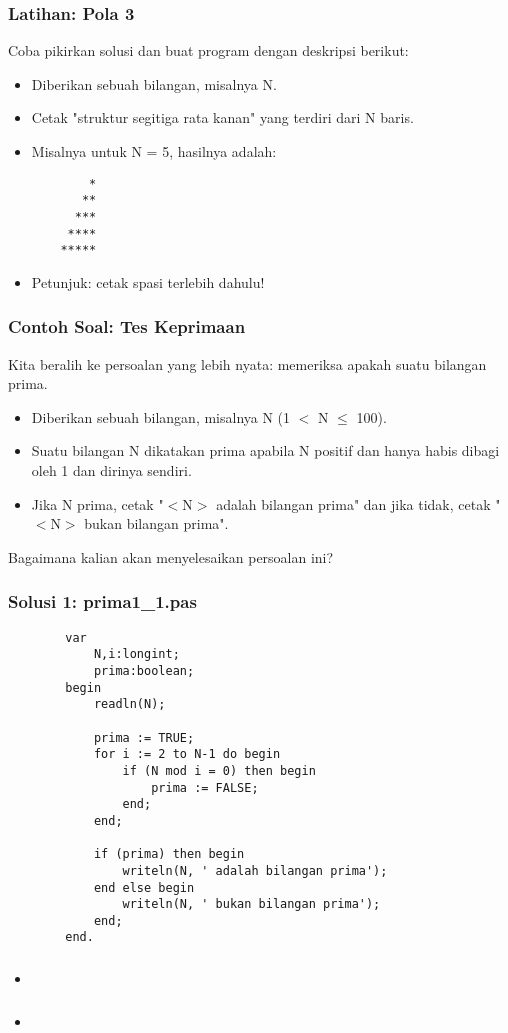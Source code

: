 \documentclass{beamer}
\begin{document}
\begin{frame}[fragile]
\frametitle{Latihan: Pola 3}
Coba pikirkan solusi dan buat program dengan deskripsi berikut:
\begin{itemize}
	\item Diberikan sebuah bilangan, misalnya N.
	\item Cetak "struktur segitiga rata kanan" yang terdiri dari N baris.
	\item Misalnya untuk N = 5, hasilnya adalah:
	\begin{lstlisting}
	    *
	   **
	  ***
	 ****
	*****
	\end{lstlisting} 
	\item Petunjuk: cetak spasi terlebih dahulu!
\end{itemize}
\end{frame}

\begin{frame}
\frametitle{Contoh Soal: Tes Keprimaan}
Kita beralih ke persoalan yang lebih nyata: memeriksa apakah suatu bilangan prima.
\begin{itemize}
	\item Diberikan sebuah bilangan, misalnya N (1 $<$ N $\leq$ 100).
	\item Suatu bilangan N dikatakan prima apabila N positif dan hanya habis dibagi oleh 1 dan dirinya sendiri.
	\item Jika N prima, cetak "$<$N$>$ adalah bilangan prima" dan jika tidak, cetak "$<$N$>$ bukan bilangan prima".
\end{itemize}
Bagaimana kalian akan menyelesaikan persoalan ini?
\end{frame}

\begin{frame}[fragile]
\frametitle{Solusi 1: prima1\_1.pas}
	\begin{lstlisting}
		var
		    N,i:longint;
		    prima:boolean;
		begin
		    readln(N);
		
		    prima := TRUE;
		    for i := 2 to N-1 do begin
		        if (N mod i = 0) then begin
		            prima := FALSE;
		        end;
		    end;
		
		    if (prima) then begin
		        writeln(N, ' adalah bilangan prima');
		    end else begin
		        writeln(N, ' bukan bilangan prima');
		    end;
		end.
	\end{lstlisting}
\end{frame}

\begin{frame}[fragile]
\frametitle{}
\begin{itemize}
	\item 
\end{itemize}
\end{frame}

\begin{frame}
\frametitle{}
\begin{itemize}
	\item 
\end{itemize}
\end{frame}
\end{document}
